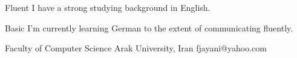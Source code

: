 \documentclass[a4paper,12pt]{memoir} %
\begin{document}


{Fluent}
{I have a strong studying background in English.}

{Basic}
{I'm currently learning German to the extent of communicating fluently.}


\Sep %




{Faculty of Computer Science}
{Arak University, Iran}
{fjayani@yahoo.com}




\Sep %
\end{document}

